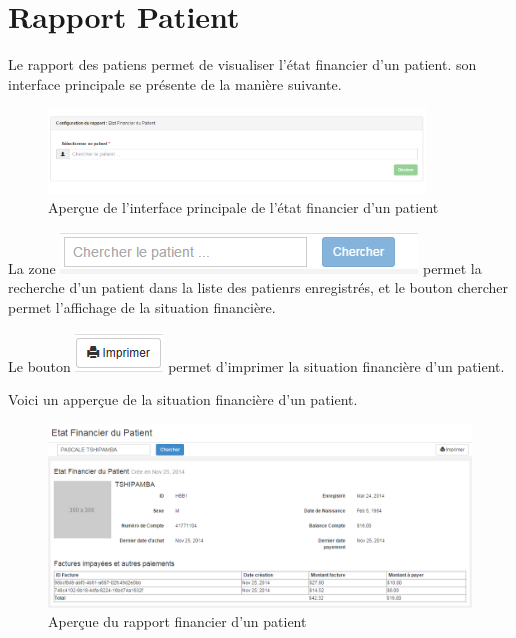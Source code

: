 \documentclass[12pt,a4paper]{report}
\begin{document}
\newpage
\section{Rapport Patient}
Le rapport des patiens permet de visualiser l'état financier d'un patient. son interface principale se présente de la manière suivante. 

\begin{figure}[h]
\begin{center}
\includegraphics[width=10cm]{pic/EtatFInPat.png}
\end{center}
\caption{Aperçue de l'interface principale de l'état financier d'un patient}
\label{Aperçue de l'interface principale de l'état financier d'un patient}
\end{figure}


La zone  \includegraphics[scale=0.7]{pic/ChechrPatient.png} permet la recherche d'un patient dans la liste des patienrs enregistrés, et le bouton chercher permet l'affichage de la situation financière.

Le bouton \includegraphics[scale=0.7]{pic/Print.png} permet d'imprimer la situation financière d'un patient.

Voici un apperçue de la situation financière d'un patient.

\begin{figure}[h]
\begin{center}
\includegraphics[width=14cm]{pic/EtatFinaApp.png}
\end{center}
\caption{Aperçue du rapport financier d'un patient}
\label{Aperçue du rapport financier d'un patient}
\end{figure}
\end{document}
